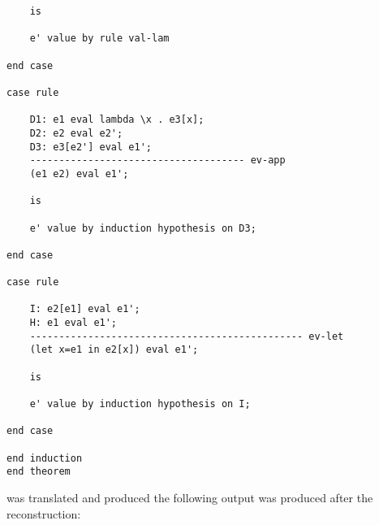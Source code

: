 \documentclass[12pt]{article}
\begin{document}
\begin{verbatim}
	is

	e' value by rule val-lam

end case

case rule 

	D1: e1 eval lambda \x . e3[x];
	D2: e2 eval e2';
	D3: e3[e2'] eval e1';
	------------------------------------- ev-app
	(e1 e2) eval e1';

	is

	e' value by induction hypothesis on D3;

end case

case rule 

	I: e2[e1] eval e1';
	H: e1 eval e1';
	----------------------------------------------- ev-let
	(let x=e1 in e2[x]) eval e1';

	is

	e' value by induction hypothesis on I;

end case

end induction 
end theorem

\end{verbatim}
was translated and produced the following output was produced after the reconstruction:
\end{document}
